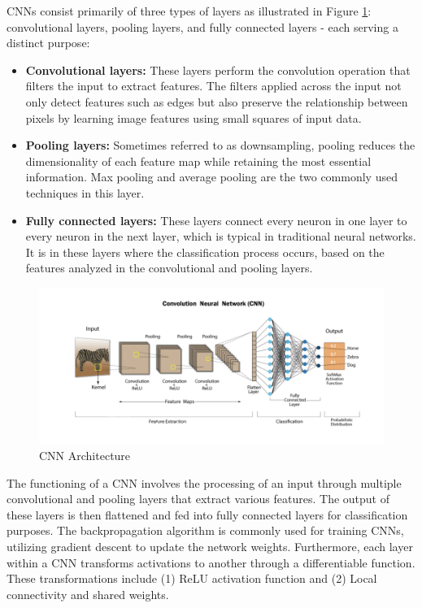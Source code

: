 \documentclass[a4paper,12pt]{article}
\begin{document}
CNNs consist primarily of three types of layers as illustrated in Figure \ref{fig:cnn_architecture}: convolutional layers, pooling layers, and fully connected layers - each serving a distinct purpose:
\begin{itemize}
    \item \textbf{Convolutional layers:} These layers perform the convolution operation that filters the input to extract features. The filters applied across the input not only detect features such as edges but also preserve the relationship between pixels by learning image features using small squares of input data.
    \item \textbf{Pooling layers:} Sometimes referred to as downsampling, pooling reduces the dimensionality of each feature map while retaining the most essential information. Max pooling and average pooling are the two commonly used techniques in this layer.
    \item \textbf{Fully connected layers:} These layers connect every neuron in one layer to every neuron in the next layer, which is typical in traditional neural networks. It is in these layers where the classification process occurs, based on the features analyzed in the convolutional and pooling layers.
\end{itemize}

\begin{figure}[H]
    \centering
    \includegraphics[width=1\textwidth]{TestImage.png}
    \caption{CNN Architecture}
    \label{fig:cnn_architecture}
\end{figure}

The functioning of a CNN involves the processing of an input through multiple convolutional and pooling layers that extract various features. The output of these layers is then flattened and fed into fully connected layers for classification purposes. The backpropagation algorithm is commonly used for training CNNs, utilizing gradient descent to update the network weights. Furthermore, each layer within a CNN transforms activations to another through a differentiable function. These transformations include (1) ReLU activation function and (2) Local connectivity and shared weights.
\end{document}
